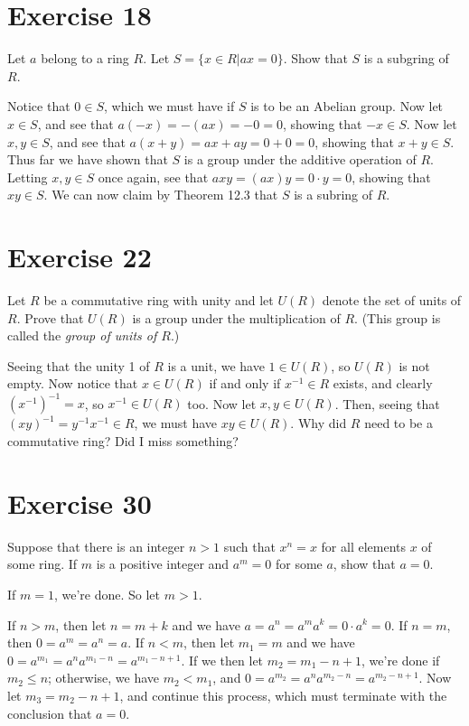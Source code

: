 \documentclass[12pt]{article}
\begin{document}
\section*{Exercise 18}

Let $a$ belong to a ring $R$.  Let $S=\{x\in R|ax=0\}$.  Show that $S$ is a subgring of $R$.

Notice that $0\in S$, which we must have if $S$ is to be an Abelian group.
Now let $x\in S$, and see that $a(-x)=-(ax)=-0=0$, showing that $-x\in S$.
Now let $x,y\in S$, and see that $a(x+y)=ax+ay=0+0=0$, showing that
$x+y\in S$.  Thus far we have shown that $S$ is a group under
the additive operation of $R$.  Letting $x,y\in S$ once again,
see that $axy=(ax)y=0\cdot y=0$, showing that $xy\in S$.
We can now claim by Theorem 12.3 that $S$ is a subring of $R$.

\section*{Exercise 22}

Let $R$ be a commutative ring with unity and let $U(R)$ denote the set of
units of $R$.  Prove that $U(R)$ is a group under the multiplication of $R$.
(This group is called the {\it group of units of $R$}.)

Seeing that the unity 1 of $R$ is a unit, we have $1\in U(R)$, so $U(R)$ is not empty.
Now notice that $x\in U(R)$ if and only if $x^{-1}\in R$ exists, and clearly $(x^{-1})^{-1}=x$,
so $x^{-1}\in U(R)$ too.  Now let $x,y\in U(R)$.  Then, seeing that $(xy)^{-1}=y^{-1}x^{-1}\in R$,
we must have $xy\in U(R)$.  Why did $R$ need to be a commutative ring?  Did I miss something?

\section*{Exercise 30}

Suppose that there is an integer $n>1$ such that $x^n=x$ for all elements
$x$ of some ring.  If $m$ is a positive integer and $a^m=0$ for some $a$,
show that $a=0$.

If $m=1$, we're done.  So let $m>1$.

If $n>m$, then let $n=m+k$ and we have $a=a^n=a^ma^k=0\cdot a^k = 0$.
If $n=m$, then $0=a^m=a^n=a$.
If $n<m$, then let $m_1=m$ and we have $0=a^{m_1}=a^na^{m_1-n}=a^{m_1-n+1}$.
If we then let $m_2=m_1-n+1$, we're done if $m_2\leq n$; otherwise, we have
$m_2<m_1$, and $0=a^{m_2}=a^na^{m_2-n}=a^{m_2-n+1}$.
Now let $m_3=m_2-n+1$, and continue this process, which must terminate with
the conclusion that $a=0$.
\end{document}
